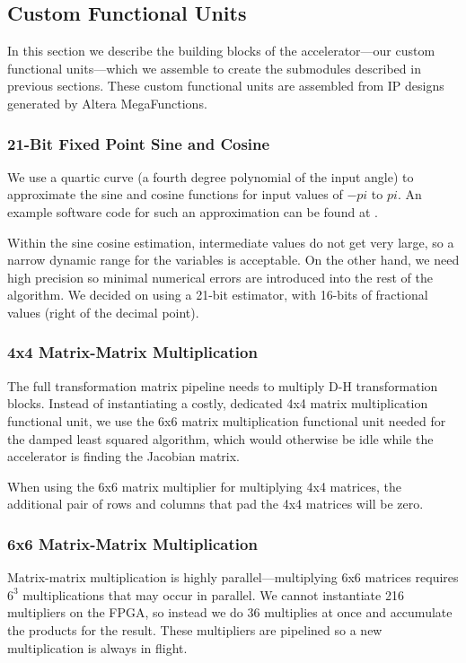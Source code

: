 \subsection{Custom Functional Units}
In this section we describe the building blocks of the accelerator---our custom functional units---which we assemble to create the submodules described in previous sections. These custom functional units are assembled from IP designs generated by Altera MegaFunctions.

\subsubsection{21-Bit Fixed Point Sine and Cosine}
We use a quartic curve (a fourth degree polynomial of the input angle) to approximate the sine and cosine functions for input values of $-pi$ to $pi$. An example software code for such an approximation can be found at \cite{sincos}. 

Within the sine cosine estimation, intermediate values do not get very large, so a narrow dynamic range for the variables is acceptable. On the other hand, we need high precision so minimal numerical errors are introduced into the rest of the algorithm. We decided on using a 21-bit estimator, with 16-bits of fractional values (right of the decimal point).

\subsubsection{4x4 Matrix-Matrix Multiplication}
The full transformation matrix pipeline needs to multiply D-H transformation blocks. Instead of instantiating a costly, dedicated 4x4 matrix multiplication functional unit, we use the 6x6 matrix multiplication functional unit needed for the damped least squared algorithm, which would otherwise be idle while the accelerator is finding the Jacobian matrix.

When using the 6x6 matrix multiplier for multiplying 4x4 matrices, the additional pair of rows and columns that pad the 4x4 matrices will be zero.

\subsubsection{6x6 Matrix-Matrix Multiplication}
Matrix-matrix multiplication is highly parallel---multiplying 6x6 matrices requires $6^3$ multiplications that may occur in parallel. We cannot instantiate 216 multipliers on the FPGA, so instead we do 36 multiplies at once and accumulate the products for the result. These multipliers are pipelined so a new multiplication is always in flight.

